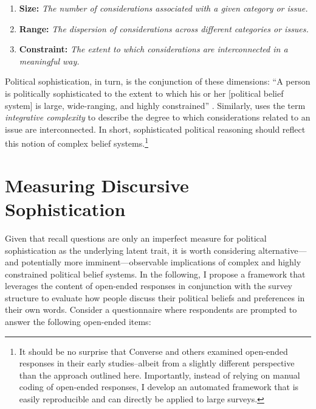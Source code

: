\begin{enumerate}
	\item \textbf{Size:} \textit{The number of considerations associated with a given category or issue.}
	\item \textbf{Range:} \textit{The dispersion of considerations across different categories or issues.}
	\item \textbf{Constraint:} \textit{The extent to which considerations are interconnected in a meaningful way.}
\end{enumerate}

Political sophistication, in turn, is the conjunction of these dimensions: ``A person is politically sophisticated to the extent to which his or her [political belief system] is large, wide-ranging, and highly constrained'' \citep[860]{luskin1987measuring}. Similarly, \citet{tetlock1983cognitive,tetlock1993cognitive} uses the term \textsl{integrative complexity} to describe the degree to which considerations related to an issue are interconnected. In short, sophisticated political reasoning should reflect this notion of complex belief systems.\footnote{It should be no surprise that Converse and others examined open-ended responses in their early studies--albeit from a slightly different perspective than the approach outlined here. Importantly, instead of relying on manual coding of open-ended responses, I develop an automated framework that is easily reproducible and can directly be applied to large surveys.}



\section*{Measuring Discursive Sophistication}


Given that recall questions are only an imperfect measure for political sophistication as the underlying latent trait, it is worth considering alternative---and potentially more imminent---observable implications of complex and highly constrained political belief systems. In the following, I propose a framework that leverages the content of open-ended responses in conjunction with the survey structure to evaluate how people discuss their political beliefs and preferences in their own words. Consider a questionnaire where respondents are prompted to answer the following open-ended items:

